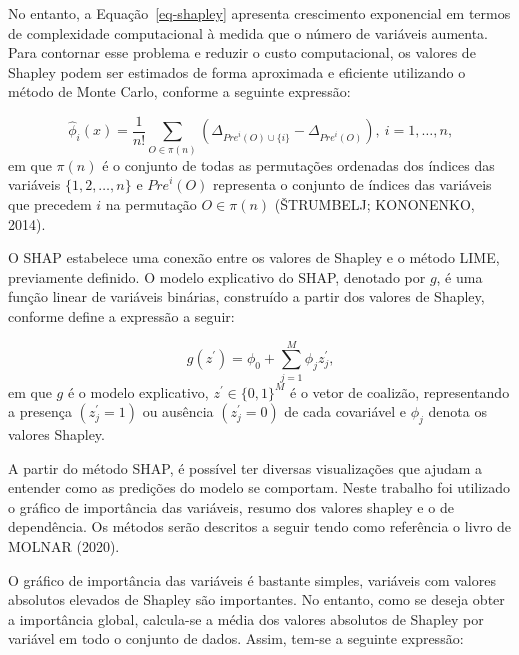 \documentclass[
  12pt,
  a4paper,
]{scrreprt}
\begin{document}
\vspace{12pt}

No entanto, a Equação~\ref{eq-shapley} apresenta crescimento exponencial
em termos de complexidade computacional à medida que o número de
variáveis aumenta. Para contornar esse problema e reduzir o custo
computacional, os valores de Shapley podem ser estimados de forma
aproximada e eficiente utilizando o método de Monte Carlo, conforme a
seguinte expressão:

\[
\hat{\phi}_{i}\left(x\right) = \frac{1}{n!} \sum_{O \in \pi \left(n \right)} \left( \Delta_{{Pre}^{i} \left(O\right) \cup \{i\}} - \Delta_{{Pre}^{i} \left(O\right)} \right), \ i = 1, \dots, n\text{,}
\] em que \(\pi\left(n\right)\) é o conjunto de todas as permutações
ordenadas dos índices das variáveis \(\{1, 2, \dots, n\}\) e
\({Pre}^{i}\left(O\right)\) representa o conjunto de índices das
variáveis que precedem \(i\) na permutação \(O \in \pi \left(n\right)\)
(ŠTRUMBELJ; KONONENKO, 2014).

\vspace{12pt}

O SHAP estabelece uma conexão entre os valores de Shapley e o método
LIME, previamente definido. O modelo explicativo do SHAP, denotado por
\(g\), é uma função linear de variáveis binárias, construído a partir
dos valores de Shapley, conforme define a expressão a seguir:

\[
g\left(z^{'}\right) = \phi_0 + \sum_{j = 1}^{M} \phi_{j} z_{j}^{'}\text{,}
\] em que \(g\) é o modelo explicativo, \(z^{'} \in \{0, 1\}^{M}\) é o
vetor de coalizão, representando a presença \(\left(z^{'}_j = 1\right)\)
ou ausência \(\left(z^{'}_j = 0\right)\) de cada covariável e \(\phi_j\)
denota os valores Shapley.

\vspace{12pt}

A partir do método SHAP, é possível ter diversas visualizações que
ajudam a entender como as predições do modelo se comportam. Neste
trabalho foi utilizado o gráfico de importância das variáveis, resumo
dos valores shapley e o de dependência. Os métodos serão descritos a
seguir tendo como referência o livro de MOLNAR (2020).

\vspace{12pt}

O gráfico de importância das variáveis é bastante simples, variáveis com
valores absolutos elevados de Shapley são importantes. No entanto, como
se deseja obter a importância global, calcula-se a média dos valores
absolutos de Shapley por variável em todo o conjunto de dados. Assim,
tem-se a seguinte expressão:
\end{document}
